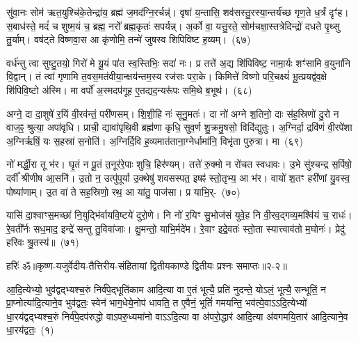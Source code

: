 सु॑वा॒नः सोम॑ ऋत॒युश्चि॑के॒तेन्द्रा॑य॒ ब्रह्म॑ ज॒मद॑ग्नि॒रर्चन्न्॑। वृषा॑ य॒न्तासि॒ शव॑सस्तु॒रस्या॒न्तर्य॑च्छ गृण॒ते ध॒र्त्रं दृꣳ॑ह। स॒बाध॑स्ते॒ मदं॑ च शुष्म॒यं च॒ ब्रह्म॒ नरो᳚ ब्रह्म॒कृतः॑ सपर्यन्न्। अ॒र्को वा॒ यत्तु॒रते॒ सोम॑चक्षा॒स्तत्रेदिन्द्रो॑ दधते पृ॒थ्सु तु॒र्याम्। वष॑ट्ते विष्णवा॒स आ कृ॑णोमि॒ तन्मे॑ जुषस्व शिपिविष्ट ह॒व्यम्।~(६७)

वर्ध॑न्तु त्वा सुष्टु॒तयो॒ गिरो॑ मे यू॒यं पा॑त स्व॒स्तिभिः॒ सदा॑ नः। प्र तत्ते॑ अ॒द्य शि॑पिविष्ट॒ नामा॒र्यः शꣳ॑सामि व॒युना॑नि वि॒द्वान्। तं त्वा॑ गृणामि त॒वस॒मत॑वीया॒न्क्षय॑न्तम॒स्य रज॑सः परा॒के। किमित्ते॑ विष्णो परि॒चक्ष्यं॑ भू॒त्प्रयद्व॑व॒क्षे शि॑पिवि॒ष्टो अ॑स्मि। मा वर्पो॑ अ॒स्मदप॑गूह ए॒तद्यद॒न्यरू॑पः समि॒थे ब॒भूथ॑।~(६८)

अग्ने॒ दा दा॒शुषे॑ र॒यिं वी॒रव॑न्तं॒ परी॑णसम्। शि॒शी॒हि नः॑ सूनु॒मतः॑। दा नो॑ अग्ने श॒तिनो॒ दाः स॑ह॒स्रिणो॑ दु॒रो न वाज॒ꣴ॒ श्रुत्या॒ अपा॑वृधि। प्राची॒ द्यावा॑\-पृथि॒वी ब्रह्म॑णा कृधि॒ सुव॒र्ण शु॒क्रमु॒षसो॒ विदि॑द्युतुः। अ॒ग्निर्दा॒ द्रवि॑णं वी॒रपे॑शा अ॒ग्निर्\mbox{}ऋषिं॒ यः स॒हस्रा॑ स॒नोति॑। अ॒ग्निर्दि॒वि ह॒व्यमात॑ताना॒ग्नेर्धामा॑नि॒ विभृ॑ता पुरु॒त्रा। मा~(६९)

नो॑ मर्द्धी॒रा तू भ॑र। घृ॒तं न पू॒तं त॒नूर॑रे॒पाः शुचि॒ हिर॑ण्यम्। तत्ते॑ रु॒क्मो न रो॑चत स्वधावः। उ॒भे सु॑श्चन्द्र स॒र्पिषो॒ दर्वी᳚ श्रीणीष आ॒सनि॑। उ॒तो न॒ उत्पु॑पूर्या उ॒क्थेषु॑ शवसस्पत॒ इषꣴ॑ स्तो॒तृभ्य॒ आ भ॑र। वायो॑ श॒तꣳ हरी॑णां यु॒वस्व॒ पोष्या॑णाम्। उ॒त वा॑ ते सह॒स्रिणो॒ रथ॒ आ या॑तु॒ पाज॑सा। प्र याभि॒र्-~(७०)

यासि॑ दा॒श्वाꣳस॒मच्छा॑ नि॒युद्भि॑र्वायवि॒ष्टये॑ दुरो॒णे। नि नो॑ र॒यिꣳ सु॒भोज॑सं युवे॒ह नि वी॒रव॒द्गव्य॒मश्वि॑यं च॒ राधः॑। रे॒वती᳚र्नः सध॒माद॒ इन्द्रे॑ सन्तु तु॒विवा॑जाः। क्षु॒मन्तो॒ याभि॒र्मदे॑म। रे॒वाꣳ इद्रे॒वतः॑ स्तो॒ता स्यात्त्वाव॑तो म॒घोनः॑। प्रेदु॑ हरिवः श्रु॒तस्य॑॥~(७१)

{\anuvakamend[जि॒नोषि॑ देभुः॒ प्र ह॒व्यं ब॒भूथ॒ मा याभि॑श्चत्वारि॒ꣳ॒शच्च॑]}

{हरिः॑ ॐ}{॥कृष्ण-यजुर्वेदीय-तैत्तिरीय-संहितायां द्वितीयकाण्डे द्वितीयः प्रश्नः समाप्तः॥२-२॥}

\setcounter{anuvakam}{0}
आ॒दि॒त्येभ्यो॒ भुव॑द्वद्भ्यश्च॒रुं निर्व॑पे॒द्भूति॑काम आदि॒त्या वा ए॒तं भूत्यै॒ प्रति॑ नुदन्ते॒ यो\-ऽलं॒ भूत्यै॒ सन्भूतिं॒ न प्रा॒प्नोत्या॑दि॒त्याने॒व भुव॑द्वतः॒ स्वेन॑ भाग॒धेये॒नोप॑ धावति॒ त ए॒वैनं॒ भूतिं॑ गमयन्ति॒ भव॑त्ये॒वा\-ऽऽ\-दि॒त्येभ्यो॑ धा॒रय॑द्वद्भ्यश्च॒रुं निर्व॑पे॒दप॑रुद्धो वा\-ऽपरु॒ध्यमा॑नो वा\-ऽऽ\-दि॒त्या वा अ॑परो॒द्धार॑ आदि॒त्या अ॑वगमयि॒तार॑ आदि॒त्याने॒व धा॒रय॑द्वतः॒~(१)

